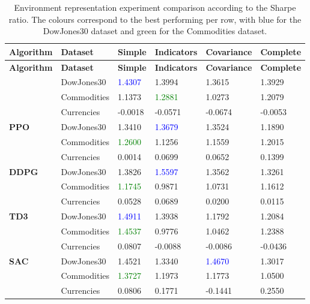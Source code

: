 \begin{longtable}{|p{2cm}|p{2.2cm}|p{2cm}|p{2cm}|p{2.2cm}|p{2cm}|}
    \caption{Environment representation experiment comparison according to the Sharpe ratio. The colours correspond to the best performing per row, with blue for the DowJones30 dataset and green for the Commodities dataset.}
    \label{tab:experiment_environment_sharpe}
    \\ 
    \hline
    \textbf{Algorithm} & \textbf{Dataset} & \textbf{Simple} & \textbf{Indicators} & \textbf{Covariance} & \textbf{Complete} \\ \midrule
    \endfirsthead

    \hline
    \textbf{Algorithm} & \textbf{Dataset} & \textbf{Simple} & \textbf{Indicators} & \textbf{Covariance} & \textbf{Complete}  \\ \midrule
    \endhead

    \endfoot

    \hline  
    \multirow{3}{*}{\textbf{A2C}}
    & DowJones30 & \textcolor{blue}{1.4307} & 1.3994 & 1.3615 & 1.3929 \\ \cline{2-6}
    & Commodities & 1.1373 & \textcolor{green}{1.2881} & 1.0273 & 1.2079 \\ \cline{2-6}
    & Currencies & -0.0018 & -0.0571 & -0.0674 & -0.0053 \\ \midrule

    \multirow{3}{*}{\textbf{PPO}}
    & DowJones30 & 1.3410 & \textcolor{blue}{1.3679} & 1.3524 & 1.1890 \\ \cline{2-6}
    & Commodities & \textcolor{green}{1.2600} & 1.1256 & 1.1559 & 1.2015 \\ \cline{2-6}
    & Currencies & 0.0014 & 0.0699 & 0.0652 & 0.1399 \\ \midrule

    \multirow{3}{*}{\textbf{DDPG}}
    & DowJones30 & 1.3826 & \textcolor{blue}{1.5597} & 1.3562 & 1.3261 \\ \cline{2-6}
    & Commodities & \textcolor{green}{1.1745} & 0.9871 & 1.0731 & 1.1612 \\ \cline{2-6}
    & Currencies & 0.0528 & 0.0689 & 0.0200 & 0.0115 \\ \midrule

    \multirow{3}{*}{\textbf{TD3}}
    & DowJones30 & \textcolor{blue}{1.4911} & 1.3938 & 1.1792 & 1.2084 \\ \cline{2-6}
    & Commodities & \textcolor{green}{1.4537} & 0.9776 & 1.0462 & 1.2388 \\ \cline{2-6}
    & Currencies & 0.0807 & -0.0088 & -0.0086 & -0.0436 \\ \midrule

    \multirow{3}{*}{\textbf{SAC}}
    & DowJones30 & 1.4521 & 1.3340 & \textcolor{blue}{1.4670} & 1.3017 \\ \cline{2-6}
    & Commodities & \textcolor{green}{1.3727} & 1.1973 & 1.1773 & 1.0500 \\ \cline{2-6}
    & Currencies & 0.0806 & 0.1771 & -0.1441 & 0.2550 \\ \midrule

\end{longtable}